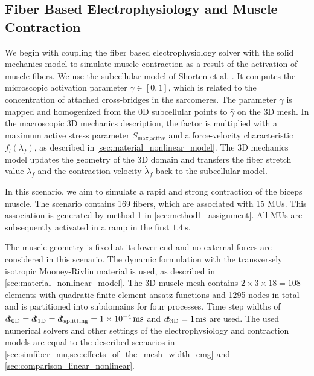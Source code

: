 \subsection{Fiber Based Electrophysiology and Muscle Contraction}\label{sec:fiber_based_contraction}

We begin with coupling the fiber based electrophysiology solver with the solid mechanics model to simulate muscle contraction as a result of the activation of muscle fibers.
We use the subcellular model of Shorten et al. \cite{Shorten2007}. It computes the microscopic activation parameter $\gamma \in [0,1]$, which is related to the concentration of attached cross-bridges in the sarcomeres. The parameter $\gamma$ is mapped and homogenized from the 0D subcellular points to $\bar{\gamma}$ on the 3D mesh. In the macroscopic 3D mechanics description, the factor is multiplied with a maximum active stress parameter $S_\text{max,active}$ and a force-velocity characteristic $f_l(\lambda_f)$, as described in \cref{sec:material_nonlinear_model}.
The 3D mechanics model updates the geometry of the 3D domain and transfers the fiber stretch value $\lambda_f$ and the contraction velocity $\dot{\lambda}_f$ back to the subcellular model.

In this scenario, we aim to simulate a rapid and strong contraction of the biceps muscle.
The scenario contains 169 fibers, which are associated with 15 MUs. This association is generated by method 1 in \cref{sec:method1_assignment}. All MUs are subsequently activated in a ramp in the first $\SI{1.4}{\s}$. 

The muscle geometry is fixed at its lower end and no external forces are considered in this scenario. The dynamic formulation with the transversely isotropic Mooney-Rivlin material is used, as described in \cref{sec:material_nonlinear_model}.
The 3D muscle mesh contains $2 \times 3 \times 18 = 108$ elements with quadratic finite element ansatz functions and 1295 nodes in total and is  partitioned into subdomains for four processes. Time step widths of $\dt_\text{0D} = \dt_\text{1D} = \dt_\text{splitting} = \SI{1e-4}{\ms}$ and $\dt_\text{3D}=\SI{1}{\ms}$ are used. The used numerical solvers and other settings of the electrophysiology and contraction models are equal to the described scenarios in \cref{sec:simfiber_mu,sec:effects_of_the_mesh_width_emg} and \cref{sec:comparison_linear_nonlinear}.

